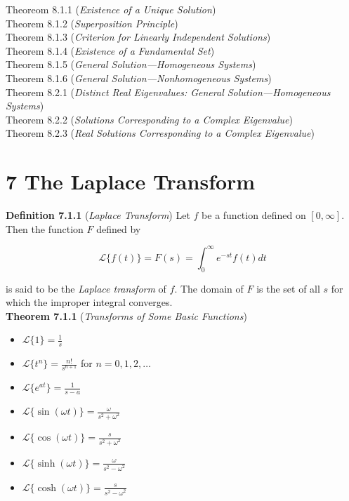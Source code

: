 \documentclass[12pt]{article}
\begin{document}
\noindent Theoreom 8.1.1 (\emph{Existence of a Unique Solution})  \\
Theorem 8.1.2 (\emph{Superposition Principle})  \\
Theorem 8.1.3 (\emph{Criterion for Linearly Independent Solutions})  \\
Theorem 8.1.4 (\emph{Existence of a Fundamental Set})  \\
Theorem 8.1.5 (\emph{General Solution—Homogeneous Systems})  \\
Theorem 8.1.6 (\emph{General Solution—Nonhomogeneous Systems})  \\
Theorem 8.2.1 (\emph{Distinct Real Eigenvalues: General Solution—Homogeneous Systems})  \\
Theorem 8.2.2 (\emph{Solutions Corresponding to a Complex Eigenvalue})  \\
Theorem 8.2.3 (\emph{Real Solutions Corresponding to a Complex Eigenvalue})  \\\newpage

\section*{7 The Laplace Transform}

\noindent\textbf{Definition 7.1.1} (\emph{Laplace Transform}) Let \(f\) be a function defined on \([0,\infty]\). Then the function \(F\) defined by

\begin{equation}
    \mathcal{L} \{f(t)\} = F(s) = \int_0^\infty e^{-st} f(t) dt
\end{equation}

\noindent is said to be the \emph{Laplace transform} of \(f\). The domain of \(F\) is the set of all \(s\) for which the improper integral converges. \\

\noindent\textbf{Theorem 7.1.1} (\emph{Transforms of Some Basic Functions})

\begin{itemize}
    \item [(a)] \(\mathcal{L} \{1\} = \frac{1}{s}\)
    \item [(b)] \(\mathcal{L} \{t^n\} = \frac{n!}{s^{n+1}}\) for \(n = 0, 1, 2, \ldots\)
    \item [(c)] \(\mathcal{L} \{e^{at}\} = \frac{1}{s-a}\)
    \item [(d)] \(\mathcal{L} \{\sin(\omega t)\} = \frac{\omega}{s^2 + \omega^2}\)
    \item [(e)] \(\mathcal{L} \{\cos(\omega t)\} = \frac{s}{s^2 + \omega^2}\)
    \item [(f)] \(\mathcal{L} \{\sinh(\omega t)\} = \frac{\omega}{s^2 - \omega^2}\)
    \item [(g)] \(\mathcal{L} \{\cosh(\omega t)\} = \frac{s}{s^2 - \omega^2}\)
\end{itemize}
\end{document}
